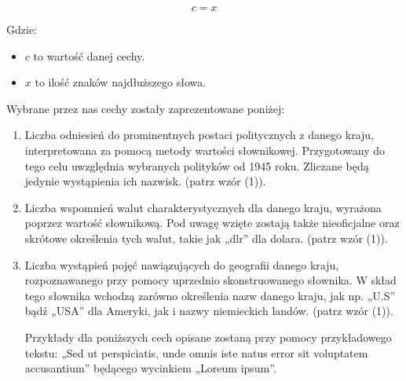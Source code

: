 \documentclass{article}
\begin{document}
\begin{equation}
    c = x
\end{equation}

Gdzie: 
\begin{itemize}
    \item $c$ to wartość danej cechy.
    \item $x$ to ilość znaków najdłuższego słowa.
\end{itemize}

Wybrane przez nas cechy zostały zaprezentowane poniżej:
\begin{enumerate}
    \item Liczba odniesień do prominentnych postaci politycznych z danego kraju, interpretowana za pomocą metody wartości słownikowej. Przygotowany do tego celu uwzględnia wybranych polityków od 1945 roku. Zliczane będą jedynie wystąpienia ich nazwisk. (patrz wzór (1)).
    \item Liczba wspomnień walut charakterystycznych dla danego kraju, wyrażona poprzez wartość słownikową. Pod uwagę wzięte zostają także nieoficjalne oraz skrótowe określenia tych walut, takie jak „dlr” dla dolara. (patrz wzór (1)).
    \item Liczba wystąpień pojęć nawiązujących do geografii danego kraju, rozpoznawanego przy pomocy uprzednio skonstruowanego słownika. W skład tego słownika wchodzą zarówno określenia nazw danego kraju, jak np. „U.S” bądź „USA” dla Ameryki, jak i nazwy niemieckich landów. (patrz wzór (1)).\newline

    Przykłady dla poniższych cech opisane zostaną przy pomocy przykładowego tekstu: „Sed ut perspiciatis, unde omnis iste natus error sit voluptatem accusantium” będącego wycinkiem „Loreum ipsum”. \newline


\end{enumerate}
\end{document}
